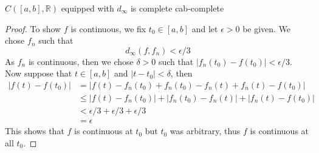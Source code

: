 \documentclass{article}
\numberwithin{equation}{section}
\numberwithin{figure}{section}
\begin{document}
\begin{theorem}{\texorpdfstring{$C([a,b],\mathbb{R})$ equipped with $d_\infty$}{The set of real continuous functions with a closed real domain equipped with the infinity metric } is complete }{cab-complete}
\begin{proof}
    To show $f$ is continuous, we fix $t_0 \in [a,b]$ and let $\epsilon>0$ be given. We chose $f_n$ such that 
    \begin{equation}
        d_\infty(f,f_n)<\epsilon/3
    \end{equation}
    As $f_n$ is continuous, then we chose $\delta>0$ such that $|f_n(t_0)-f(t_0)|<\epsilon/3$. Now suppose that $t \in [a,b]$ and $|t-t_0|<\delta$, then 
    \begin{align}
        |f(t)-f(t_0)| &= |f(t)-f_n(t_0)+f_n(t_0)-f_n(t)+f_n(t)-f(t_0)|\\
        &\leq |f(t)-f_n(t_0)| +|f_n(t_0)-f_n(t)| + |f_n(t)-f(t_0)|\\
        &< \epsilon/3 + \epsilon/3 +\epsilon/3\\
        &= \epsilon
    \end{align}
    This shows that $f$ is continuous at $t_0$ but $t_0$ was arbitrary, thus $f$ is continuous at all $t_0$.
\end{proof}
\end{theorem}
\end{document}
